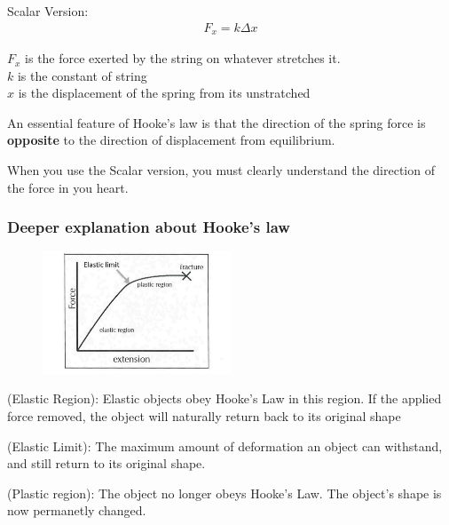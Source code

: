 Scalar Version:
\begin{gather}
    F_x = k \Delta x
\end{gather}

\begin{center}
    $F_x$ is the force exerted by the string on whatever stretches it.\\
    $k$ is the constant of string\\
    $x$ is the displacement of the spring from its unstratched
\end{center}

An essential feature of Hooke's law is that the direction of the spring force is \textbf{opposite} to the direction of displacement from equilibrium. 

\begin{remark}
    When you use the Scalar version, you must clearly understand the direction of the force in you heart. 
\end{remark}

\newpage
\subsubsection*{Deeper explanation about Hooke's law}
\begin{figure}[h!]
    \centering
    \includegraphics[width=0.5\textwidth]{graph/Hooke's Law.png}
\end{figure}

\begin{definition}
    (Elastic Region): Elastic objects obey Hooke's Law in this region. If the applied force removed, the object will naturally 
    return back to its original shape
\end{definition}

\begin{definition}
    (Elastic Limit): The maximum amount of deformation an object can withstand, and still return to its original shape. 
\end{definition}

\begin{definition}
    (Plastic region): The object no longer obeys Hooke's Law. The object's shape is now permanetly changed. 
\end{definition}

